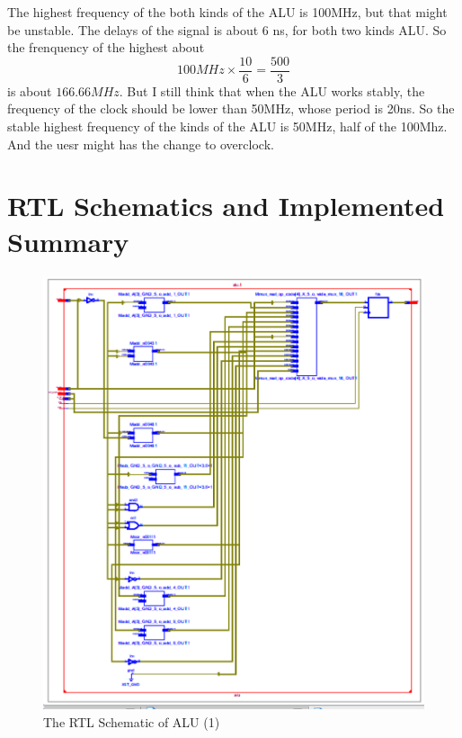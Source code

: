 \documentclass{article}
\begin{document}
      The highest frequency of the both kinds of the ALU is 100MHz, but that might be unstable.
      The delays of the signal is about 6 ns, for both two kinds ALU.
      So the frenquency of the highest about $$100MHz \times \frac{10}{6} = \frac{500}{3}$$
      is about $166.66MHz$. But I still think that when the ALU works stably, the frequency of the clock should be
      lower than 50MHz, whose period is 20ns.
      So the stable highest frequency of the kinds of the ALU is 50MHz, half of the 100Mhz.
      And the uesr might has the change to overclock.

      \section{RTL Schematics and Implemented Summary}
      \label{sec:rsnis}

\begin{figure}
\centering
\includegraphics[width=1\linewidth]{homework6-8}
\caption{The RTL Schematic of ALU (1)}
\label{fig:homework6-8}
\end{figure}
\end{document}
